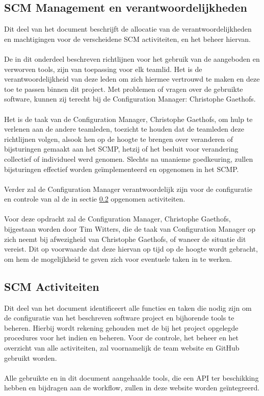 \subsection{SCM Management en verantwoordelijkheden}
Dit deel van het document beschrijft de allocatie van de verantwoordelijkheden en machtigingen voor de verscheidene SCM activiteiten, en het beheer hiervan.
\\
\\
De in dit onderdeel beschreven richtlijnen voor het gebruik van de aangeboden en verworven tools, zijn van toepassing voor elk teamlid. Het is de verantwoordelijkheid van deze leden om zich hiermee vertrouwd te maken en deze toe te passen binnen dit project. Met problemen of vragen over de gebruikte software, kunnen zij terecht bij de Configuration Manager: Christophe Gaethofs.
\\
\\
Het is de taak van de Configuration Manager, Christophe Gaethofs, om hulp te verlenen aan de andere teamleden, toezicht te houden dat de teamleden deze richtlijnen volgen, alsook hen op de hoogte te brengen over veranderen of bijsturingen gemaakt aan het SCMP, hetzij of het besluit voor verandering collectief of individueel werd genomen. Slechts na unanieme goedkeuring, zullen bijsturingen effectief worden geïmplementeerd en opgenomen in het SCMP.
\\
\\
Verder zal de Configuration Manager verantwoordelijk zijn voor de configuratie en controle van al de in sectie \ref{sec:SCMActiviteiten} opgenomen activiteiten.
\\
\\
Voor deze opdracht zal de Configuration Manager, Christophe Gaethofs, bijgestaan worden door Tim Witters, die de taak van Configuration Manager op zich neemt bij afwezigheid van Christophe Gaethofs, of waneer de situatie dit vereist. Dit op voorwaarde dat deze hiervan op tijd op de hoogte wordt gebracht, om hem de mogelijkheid te geven zich voor eventuele taken in te werken.

\subsection{SCM Activiteiten} \label{sec:SCMActiviteiten}
Dit deel van het document identificeert alle functies en taken die nodig zijn om de configuratie van het beschreven software project en bijhorende tools te beheren. Hierbij wordt rekening gehouden met de bij het project opgelegde procedures voor het indien en beheren. Voor de controle, het beheer en het overzicht van alle activiteiten, zal voornamelijk de team website \cite{portalWebsite} en GitHub gebruikt worden.
\\
\\
Alle gebruikte en in dit document aangehaalde tools, die een API ter beschikking hebben en bijdragen aan de workflow, zullen in deze website worden geïntegreerd.

